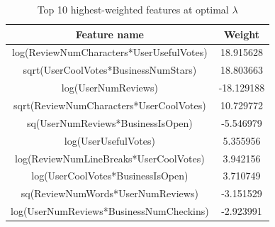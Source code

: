 \documentclass[11pt,letterpaper]{article}
\numberwithin{equation}{section}
\numberwithin{figure}{section}
\begin{document}
\begin{enumerate}
\begin{enumerate}
		\begin{table}[H]
			\centering
			\begin{tabular}{c|c}
				Feature name & Weight\\\hline
				log(ReviewNumCharacters*UserUsefulVotes) &  18.915628\\
				sqrt(UserCoolVotes*BusinessNumStars)     &  18.803663\\
				log(UserNumReviews)                      & -18.129188\\
				sqrt(ReviewNumCharacters*UserCoolVotes)  &  10.729772\\
				sq(UserNumReviews*BusinessIsOpen)        & -5.546979 \\
				log(UserUsefulVotes)                     &  5.355956 \\
				log(ReviewNumLineBreaks*UserCoolVotes)   &  3.942156 \\
				log(UserCoolVotes*BusinessIsOpen)        &  3.710749 \\
				sq(ReviewNumWords*UserNumReviews)        & -3.151529 \\
				log(UserNumReviews*BusinessNumCheckins)  & -2.923991 \\
			\end{tabular}
			\caption{Top 10 highest-weighted features at optimal $\lambda$}
			\label{tab:topfeats}
		\end{table}
	\end{enumerate}















\end{enumerate}
\end{document}
